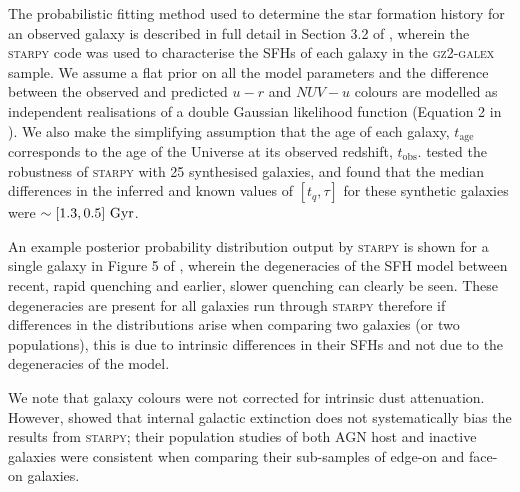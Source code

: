 \documentclass[useAMS,usenatbib]{mn2e}
\def\minor		{\color{minorcol}}
\begin{document}

The probabilistic fitting method used to determine the star formation history for an observed galaxy is described in full detail in Section 3.2 of \cite{smethurst15}, wherein the \textsc{starpy} code was used to characterise the SFHs of each galaxy in the \textsc{gz2-galex} sample. We assume a flat prior on all the model parameters and the difference between the observed and predicted $u-r$ and $NUV-u$ colours are modelled as independent realisations of a double Gaussian likelihood function (Equation 2 in \citealt{smethurst15}). We also make the simplifying assumption that the age of each galaxy, $t_\mathrm{age}$ corresponds to the age of the Universe at its observed redshift, $t_\mathrm{obs}$. {\minor\cite{smethurst15} tested the robustness of \textsc{starpy} with 25 synthesised galaxies, and found that the median differences in the inferred and known values of $[t_q, \tau]$ for these synthetic galaxies were $\sim[1.3, 0.5]~\rm{Gyr}$.}

An example posterior probability distribution output by \textsc{starpy} is shown for a single galaxy in Figure 5 of \cite{smethurst15}, wherein the degeneracies of the SFH model {\minor between recent, rapid quenching and earlier, slower quenching can clearly be seen}. These degeneracies are present for all galaxies run through \textsc{starpy} therefore if differences in the distributions arise when comparing two galaxies (or two populations), this is due to intrinsic differences in their SFHs and not due to the degeneracies of the model. 

We note that galaxy colours were not corrected for intrinsic dust attenuation. However,  \citet[][see Section~2.2]{smethurst16} showed that internal galactic extinction does not systematically bias the results from \textsc{starpy}; {\minor their population studies of both AGN host and inactive galaxies were consistent when comparing their sub-samples of edge-on and face-on galaxies}. 
\end{document}
